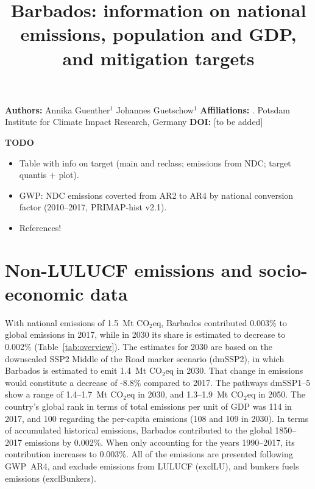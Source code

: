 \documentclass[12pt]{article}
\title{ \bfseries \color{PIKorange} Barbados: information on national emissions, population and GDP, and mitigation targets}
\begin{document}
 \maketitle

 \noindent \textbf{Authors:} \newline
 \indent Annika Guenther$^{1}$ \newline
 \indent Johannes Guetschow$^{1}$ \newline
 \noindent \textbf{Affiliations:} \newline
 . Potsdam Institute for Climate Impact Research, Germany \newline
 \noindent \textbf{DOI:} [to be added] \newline

 \textbf{TODO}
 \begin{itemize}
 \item Table with info on target (main and reclass; emissions from NDC; target quantis + plot).
 \item GWP: NDC emissions coverted from AR2 to AR4 by national conversion factor (2010--2017, PRIMAP-hist v2.1).
 \item References!
 \end{itemize}

 \newpage %
 \section{Non-LULUCF emissions and socio-economic data}
 \label{sec:nonLULUCFSocioEco}
 With national emissions of 1.5~Mt CO$_2$eq, Barbados contributed 0.003\% to global emissions in 2017, while in 2030 its share is estimated to decrease to 0.002\% (Table~\ref{tab:overview}).
 The estimates for 2030 are based on the downscaled SSP2 Middle of the Road marker scenario (dmSSP2), in which Barbados is estimated to emit 1.4~Mt CO$_2$eq in 2030.
 That change in emissions would constitute a decrease of -8.8\% compared to 2017. 
 The pathways dmSSP1--5 show a range of 1.4--1.7~Mt CO$_2$eq in 2030, and 1.3--1.9~Mt CO$_2$eq in 2050.
 The country's global rank in terms of total emissions per unit of GDP was 114 in 2017, and 100 regarding the per-capita emissions (108 and 109 in 2030).
 In terms of accumulated historical emissions, Barbados contributed to the global 1850--2017 emissions by 0.002\%. 
 When only accounting for the years 1990--2017, its contribution increases to 0.003\%.
 All of the emissions are presented following GWP~AR4, and exclude emissions from LULUCF (exclLU), and bunkers fuels emissions (exclBunkers).
\end{document}
